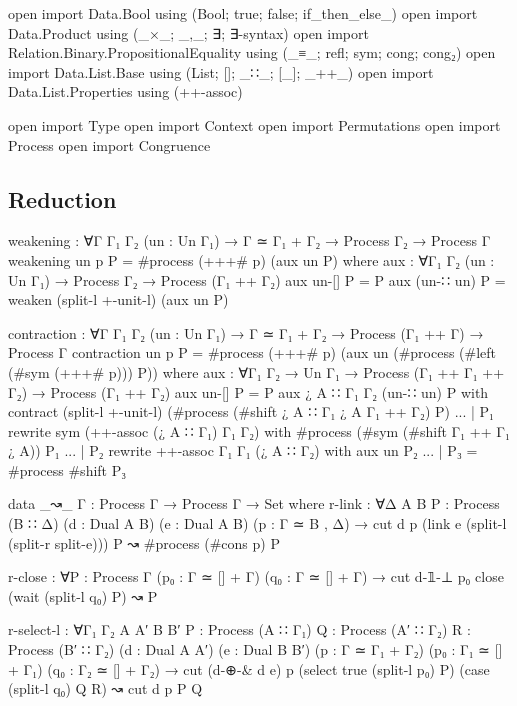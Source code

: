 \begin{code}[hide]
open import Data.Bool using (Bool; true; false; if_then_else_)
open import Data.Product using (_×_; _,_; ∃; ∃-syntax)
open import Relation.Binary.PropositionalEquality using (_≡_; refl; sym; cong; cong₂)
open import Data.List.Base using (List; []; _∷_; [_]; _++_)
open import Data.List.Properties using (++-assoc)

open import Type
open import Context
open import Permutations
open import Process
open import Congruence
\end{code}

\subsection{Reduction}
\label{sec:reduction-agda}

\begin{code}
weakening : ∀{Γ Γ₁ Γ₂} (un : Un Γ₁) → Γ ≃ Γ₁ + Γ₂ → Process Γ₂ → Process Γ
weakening un p P = #process (+++# p) (aux un P)
  where
    aux : ∀{Γ₁ Γ₂} (un : Un Γ₁) → Process Γ₂ → Process (Γ₁ ++ Γ₂)
    aux un-[] P = P
    aux (un-∷ un) P = weaken (split-l +-unit-l) (aux un P)

contraction : ∀{Γ Γ₁ Γ₂} (un : Un Γ₁) → Γ ≃ Γ₁ + Γ₂ → Process (Γ₁ ++ Γ) → Process Γ
contraction un p P = #process (+++# p) (aux un (#process (#left (#sym (+++# p))) P))
  where
    aux : ∀{Γ₁ Γ₂} → Un Γ₁ → Process (Γ₁ ++ Γ₁ ++ Γ₂) → Process (Γ₁ ++ Γ₂)
    aux un-[] P = P
    aux {¿ A ∷ Γ₁} {Γ₂} (un-∷ un) P with contract (split-l +-unit-l) (#process (#shift {¿ A ∷ Γ₁} {¿ A} {Γ₁ ++ Γ₂}) P)
    ... | P₁ rewrite sym (++-assoc (¿ A ∷ Γ₁) Γ₁ Γ₂) with #process (#sym (#shift {Γ₁ ++ Γ₁} {¿ A})) P₁
    ... | P₂ rewrite ++-assoc Γ₁ Γ₁ (¿ A ∷ Γ₂) with aux un P₂
    ... | P₃ = #process #shift P₃

data _↝_ {Γ} : Process Γ → Process Γ → Set where
  r-link :
    ∀{Δ A B} {P : Process (B ∷ Δ)} (d : Dual A B) (e : Dual A B) (p : Γ ≃ B , Δ) →
    cut d p (link e (split-l (split-r split-e))) P ↝ #process (#cons p) P

  r-close :
    ∀{P : Process Γ} (p₀ : Γ ≃ [] + Γ) (q₀ : Γ ≃ [] + Γ) →
    cut d-𝟙-⊥ p₀ close (wait (split-l q₀) P) ↝ P

  r-select-l :
    ∀{Γ₁ Γ₂ A A′ B B′}
    {P : Process (A ∷ Γ₁)} {Q : Process (A′ ∷ Γ₂)} {R : Process (B′ ∷ Γ₂)}
    (d : Dual A A′) (e : Dual B B′) (p : Γ ≃ Γ₁ + Γ₂) (p₀ : Γ₁ ≃ [] + Γ₁) (q₀ : Γ₂ ≃ [] + Γ₂) →
    cut (d-⊕-& d e) p
        (select true (split-l p₀) P)
        (case (split-l q₀) Q R) ↝ cut d p P Q


\end{code}
